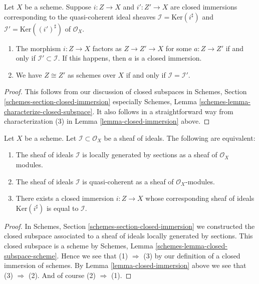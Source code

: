 \begin{lemma}
\label{lemma-closed-immersion-ideals}
Let $X$ be a scheme.
Suppose $i : Z \to X$ and $i' : Z' \to X$ are closed immersions
corresponding to the quasi-coherent
ideal sheaves $\mathcal{I} = \text{Ker}(i^\sharp)$
and $\mathcal{I}' = \text{Ker}((i')^\sharp)$ of $\mathcal{O}_X$.
\begin{enumerate}
\item The morphism $i : Z \to X$ factors as $Z \to Z' \to X$
for some $a : Z \to Z'$
if and only if $\mathcal{I}' \subset \mathcal{I}$.
If this happens, then $a$ is a closed immersion.
\item We have $Z \cong Z'$ as schemes over $X$ if and only if
$\mathcal{I} = \mathcal{I}'$.
\end{enumerate}
\end{lemma}

\begin{proof}
This follows from our discussion of closed subspaces in
Schemes, Section \ref{schemes-section-closed-immersion} especially
Schemes, Lemma \ref{schemes-lemma-characterize-closed-subspace}.
It also follows in a straightforward way from characterization
(3) in Lemma \ref{lemma-closed-immersion} above.
\end{proof}

\begin{lemma}
\label{lemma-closed-immersion-bijection-ideals}
Let $X$ be a scheme.
Let $\mathcal{I} \subset \mathcal{O}_X$ be a sheaf of ideals.
The following are equivalent:
\begin{enumerate}
\item The sheaf of ideals $\mathcal{I}$ is locally generated by
sections as a sheaf of $\mathcal{O}_X$ modules.
\item The sheaf of ideals $\mathcal{I}$ is quasi-coherent as
a sheaf of $\mathcal{O}_X$-modules.
\item There exists a closed immersion $i : Z \to X$ whose
corresponding sheaf of ideals $\text{Ker}(i^\sharp)$ is
equal to $\mathcal{I}$.
\end{enumerate}
\end{lemma}

\begin{proof}
In Schemes, Section \ref{schemes-section-closed-immersion} we constructed
the closed subspace associated to a sheaf of ideals locally generated
by sections. This closed subspace is a scheme by
Schemes, Lemma \ref{schemes-lemma-closed-subspace-scheme}.
Hence we see that (1) $\Rightarrow$ (3) by our definition
of a closed immersion of schemes. By Lemma \ref{lemma-closed-immersion}
above we see that (3) $\Rightarrow$ (2). And of course (2) $\Rightarrow$ (1).
\end{proof}

